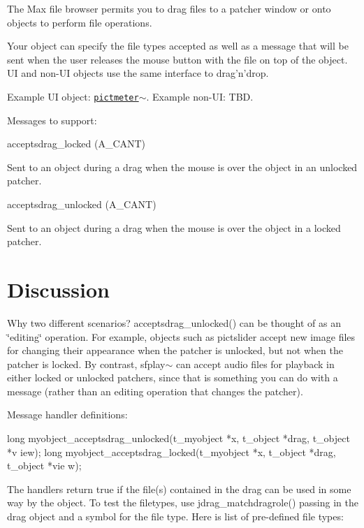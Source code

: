 The Max file browser permits you to drag files to a patcher window or onto objects to perform file operations.

Your object can specify the file types accepted as well as a message that will be sent when the user releases the mouse button with the file on top of the object. UI and non-\/UI objects use the same interface to drag'n'drop.

Example UI object: \href{pictmeter~_8c-source.html}{\tt pictmeter$\sim$}. Example non-\/UI: TBD.

Messages to support: 
\begin{DoxyCode}
    acceptsdrag_locked (A_CANT)
\end{DoxyCode}


Sent to an object during a drag when the mouse is over the object in an unlocked patcher. 
\begin{DoxyCode}
    acceptsdrag_unlocked (A_CANT)
\end{DoxyCode}


Sent to an object during a drag when the mouse is over the object in a locked patcher.\hypertarget{chapter_dragndrop_chapter_dragndrop_discussion}{}\section{Discussion}\label{chapter_dragndrop_chapter_dragndrop_discussion}
Why two different scenarios? acceptsdrag\_\-unlocked() can be thought of as an \char`\"{}editing\char`\"{} operation. For example, objects such as pictslider accept new image files for changing their appearance when the patcher is unlocked, but not when the patcher is locked. By contrast, sfplay$\sim$ can accept audio files for playback in either locked or unlocked patchers, since that is something you can do with a message (rather than an editing operation that changes the patcher).

Message handler definitions: 
\begin{DoxyCode}
    long myobject_acceptsdrag_unlocked(t_myobject *x, t_object *drag, t_object *v
      iew);
    long myobject_acceptsdrag_locked(t_myobject *x, t_object *drag, t_object *vie
      w);
\end{DoxyCode}


The handlers return true if the file(s) contained in the drag can be used in some way by the object. To test the filetypes, use jdrag\_\-matchdragrole() passing in the drag object and a symbol for the file type. Here is list of pre-\/defined file types:


